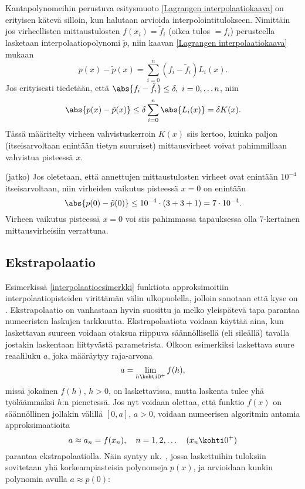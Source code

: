 Kantapolynomeihin perustuva esitysmuoto \eqref{Lagrangen interpolaatiokaava} on erityisen
kätevä silloin, kun halutaan arvioida  interpolointitulokseen. 
Nimittäin jos virheellisten mittaustulosten $f(x_i)=\tilde{f}_i$ (oikea tulos $=f_i$)
perusteella lasketaan interpolaatiopolynomi $\tilde{p}$, niin kaavan
\eqref{Lagrangen interpolaatiokaava} mukaan
\[ 
p(x)-\tilde{p}(x) = \sum_{i=0}^n (f_i-\tilde{f}_i) L_i(x). 
\]
Jos erityisesti tiedetään, että $\abs{f_i-\tilde{f}_i} \le \delta,\ i=0,\ldots n$, niin
\[ 
\abs{p(x)-\tilde{p}(x)} \le \delta \sum_{i=0}^n \abs{L_i(x)} = \delta K(x). 
\]
Tässä määritelty virheen vahvistuskerroin $K(x)$ siis kertoo, kuinka paljon (itseis\-arvoltaan 
enintään tietyn suuruiset) mittausvirheet voivat pahimmillaan vahvistua pisteessä $x$.
\jatko \begin{Exa} (jatko) Jos oletetaan, että annettujen mittaustulosten virheet ovat enintään
$10^{-4}$ itseisarvoltaan, niin virheiden vaikutus pisteessä $x=0$ on enintään
\[ 
\abs{p(0) - \tilde{p}(0)} \le 10^{-4} \cdot (3+3+1) = 7 \cdot 10^{-4}. 
\]
Virheen vaikutus pisteessä $x=0$ voi siis pahimmassa tapauksessa olla $7$-kertainen
mittausvirheisiin verrattuna. \loppu
\end{Exa}

\subsection{Ekstrapolaatio}

Esimerkissä \ref{interpolaatioesimerkki} funktiota approksimoitiin interpolaatiopisteiden 
virittämän välin ulkopuolella, jolloin sanotaan että kyse on . 
Ekstrapolaatio on vanhastaan hyvin suosittu ja melko yleispätevä tapa parantaa numeeristen 
laskujen tarkkuutta. Ekstrapolaatiota voidaan käyttää aina, kun laskettavan suureen voidaan 
otaksua riippuva säännöllisellä (eli sileällä) tavalla jostakin laskentaan liittyvästä 
parametrista. Olkoon esimerkiksi laskettava suure reaaliluku $a$, joka määräytyy raja-arvona
\[
a=\lim_{h\kohti 0^+} f(h),
\]
missä jokainen $f(h)$, $h>0$, on laskettavissa, mutta laskenta tulee yhä työläämmäksi $h$:n 
pienetessä. Jos nyt voidaan olettaa, että funktio $f(x)$ on säännöllinen jollakin välillä 
$[0,a]$, $a>0$, voidaan numeerisen algoritmin antamia approksimaatioita
\[
a\approx a_n=f(x_n),\quad n=1,2,\ldots\quad (x_n\kohti 0^+)
\]
parantaa ekstrapolaatiolla. Näin syntyy nk.\ , jossa laskettuihin 
tuloksiin sovitetaan yhä korkeampiasteisia polynomeja $p(x)$, ja arvioidaan kunkin polynomin
avulla $a\approx p(0)$:

